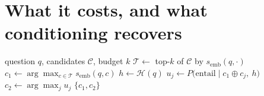 \documentclass[conference]{IEEEtran}
\newcommand{\semb}{s_{\mathrm{emb}}}
\begin{document}
\section{What it costs, and what conditioning recovers}
\label{sec:endtoend}

\begin{algorithm}[t]
\caption{Conditional evidence selection}
\label{alg:cond}
\begin{algorithmic}[1]
\Require question $q$, candidates $\mathcal{C}$, budget $k$
\State $\mathcal{T}\gets$ top-$k$ of $\mathcal{C}$ by $\semb(q,\cdot)$
\State $c_1\gets\arg\max_{c\in\mathcal{T}}\semb(q,c)$
\State $h\gets\mathcal{H}(q)$ 
  \State $u_j\gets P\big(\text{entail}\mid c_1\oplus c_j,\ h\big)$
\EndFor
\State $c_2\gets\arg\max_j u_j$
\State \Return $\{c_1,c_2\}$
\end{algorithmic}
\end{algorithm}
\end{document}
